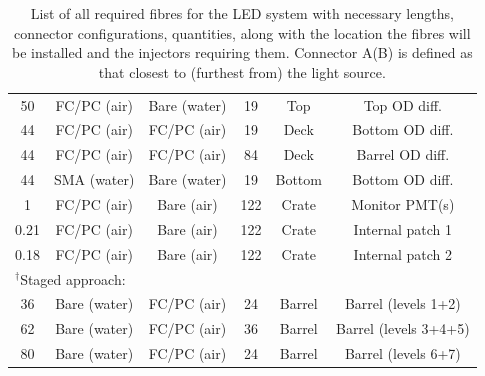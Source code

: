 \documentclass[a4paper,11pt]{article}
\providecommand{\DIFaddendFL}{} %
\DeclareRobustCommand{\DIFaddendFL}{\DIFOaddendFL \let\includegraphics\DIFOincludegraphics} %
\begin{document}
\begin{table}[h]
{\begin{tabular}{cccccc}
50			&	FC/PC (air)	&	Bare (water)	&	19				&	Top				& Top OD diff. \\
44			&	FC/PC (air)	&	FC/PC (air)		&	19				&	Deck			& Bottom OD diff. \\
44			&	FC/PC (air)	&	FC/PC (air)		&	84				&	Deck			& Barrel OD diff. \\
44			&	SMA (water)	&	Bare (water)	&	19				&	Bottom			& Bottom OD diff.	\\
1			&	FC/PC (air)	&	Bare (air)		&	122				&	Crate			& Monitor PMT(s)	\\
0.21		&	FC/PC (air)	&	Bare (air)		&	122				&	Crate 			& Internal patch 1	\\
0.18		&	FC/PC (air)	&	Bare (air)		&	122				&	Crate			& Internal patch 2 \\ \midrule
\multicolumn{3}{l}{$^\dagger$Staged approach:}			&					&			\\
36			&	Bare (water)	&	FC/PC (air)	&	24				&	Barrel &	Barrel (levels 1+2) \\
62			&	Bare (water)	&	FC/PC (air)	&	36				&	Barrel &	Barrel (levels 3+4+5)	\\
80			&	Bare (water)	&	FC/PC (air)	&	24				&	Barrel &	Barrel (levels 6+7)	\\
\bottomrule
\end{tabular}
}
\DIFaddendFL \caption{List of all required fibres for the LED system with necessary lengths, connector configurations, quantities, along with the location the fibres will be installed and the injectors requiring them. Connector A(B) is defined as that closest to (furthest from) the light source.}\label{tab:fibreDetailsLED}
\end{table}
\end{document}
